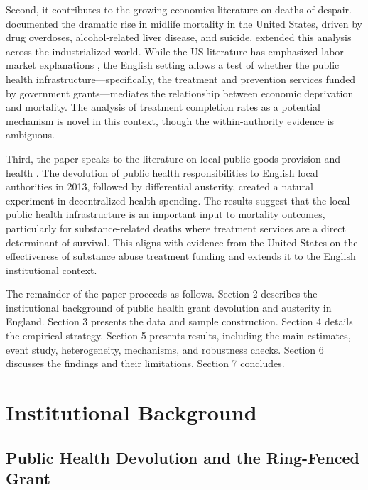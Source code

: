 \documentclass[12pt]{article}
\begin{document}
Second, it contributes to the growing economics literature on deaths of despair. \citet{case2015} documented the dramatic rise in midlife mortality in the United States, driven by drug overdoses, alcohol-related liver disease, and suicide. \citet{case2020} extended this analysis across the industrialized world. While the US literature has emphasized labor market explanations \citep{pierce2020, autor2019, venkataramani2020, hollingsworth2017, ruhm2019}, the English setting allows a test of whether the public health infrastructure---specifically, the treatment and prevention services funded by government grants---mediates the relationship between economic deprivation and mortality. The analysis of treatment completion rates as a potential mechanism is novel in this context, though the within-authority evidence is ambiguous.

Third, the paper speaks to the literature on local public goods provision and health \citep{cutler2006, currie2011}. The devolution of public health responsibilities to English local authorities in 2013, followed by differential austerity, created a natural experiment in decentralized health spending. The results suggest that the local public health infrastructure is an important input to mortality outcomes, particularly for substance-related deaths where treatment services are a direct determinant of survival. This aligns with evidence from the United States on the effectiveness of substance abuse treatment funding \citep{dave2021, powell2019, bondurant2018} and extends it to the English institutional context.

The remainder of the paper proceeds as follows. Section 2 describes the institutional background of public health grant devolution and austerity in England. Section 3 presents the data and sample construction. Section 4 details the empirical strategy. Section 5 presents results, including the main estimates, event study, heterogeneity, mechanisms, and robustness checks. Section 6 discusses the findings and their limitations. Section 7 concludes.


\section{Institutional Background}

\subsection{Public Health Devolution and the Ring-Fenced Grant}
\end{document}
